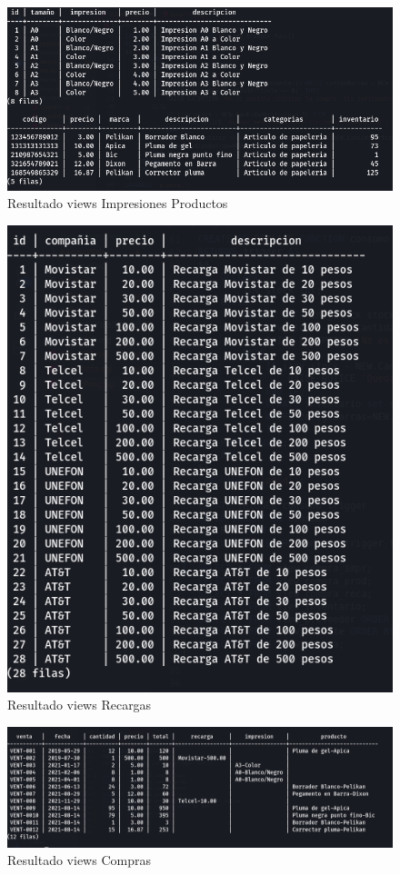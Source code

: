\documentclass[letter,12pt]{article}
\begin{document}
\newpage
\begin{figure}[H]
\includegraphics[scale=.60]{viewImpreProdR.png}
\caption{Resultado views Impresiones Productos}
\end{figure}
\begin{figure}[H]
\includegraphics[scale=.6]{viewRecargaR.png}
\caption{Resultado views Recargas}
\end{figure}
\begin{figure}[H]
\includegraphics[scale=.5]{viewConsumoR.png}
\caption{Resultado views Compras}
\end{figure}
\end{document}

